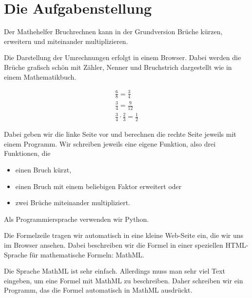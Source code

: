 \section{Die Aufgabenstellung}

Der Mathehelfer Bruchrechnen kann in der Grundversion Brüche kürzen, erweitern und miteinander multiplizieren.

Die Darstellung der Umrechnungen erfolgt in einem Browser. Dabei werden die Brüche grafisch schön mit Zähler, Nenner und Bruchstrich dargestellt wie in einem Mathematikbuch.

\begin{align*}
& \frac{6}{8} = \frac{3}{4} & \\[2ex]
& \frac{3}{4} = \frac{9}{12} & \\[2ex]
& \frac{3}{4} \cdot \frac{2}{3} = \frac{1}{2} & 
\end{align*}


Dabei geben wir die linke Seite vor und berechnen die rechte Seite jeweils mit einem Programm. Wir schreiben jeweils eine eigene Funktion, also drei Funktionen, die

\begin{itemize}
	\item einen Bruch kürzt,
	\item einen Bruch mit einem beliebigen Faktor erweitert oder
	\item zwei Brüche miteinander multipliziert.
\end{itemize}

Als Programmiersprache verwenden wir Python.

Die Formelzeile tragen wir automatisch in eine kleine Web-Seite ein, die wir uns im Browser ansehen. Dabei beschreiben wir die Formel in einer speziellen HTML-Sprache für mathematische Formeln: MathML.

Die Sprache MathML ist sehr einfach. Allerdings muss man sehr viel Text eingeben, um eine Formel mit MathML zu beschreiben. Daher schreiben wir ein Programm, das die Formel automatisch in MathML ausdrückt.